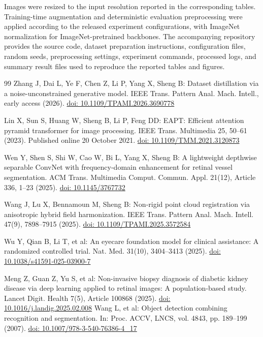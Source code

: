 \documentclass[pdflatex,sn-mathphys-num]{sn-jnl}
\theoremstyle{thmstyleone}
\theoremstyle{thmstyletwo}
\theoremstyle{thmstylethree}
\begin{document}
Images were resized to the input resolution reported in the corresponding
tables. Training-time augmentation and deterministic evaluation preprocessing
were applied according to the released experiment configurations, with
ImageNet normalization for ImageNet-pretrained backbones. The accompanying
repository provides the source code, dataset preparation instructions,
configuration files, random seeds, preprocessing settings, experiment
commands, processed logs, and summary result files used to reproduce the
reported tables and figures. \begin{thebibliography}{99}
Zhang J, Dai L, Ye F, Chen Z, Li P, Yang X, Sheng B:
Dataset distillation via a noise-unconstrained generative model.
IEEE Trans. Pattern Anal. Mach. Intell., early access (2026).
\href{https://doi.org/10.1109/TPAMI.2026.3690778}
{doi: 10.1109/TPAMI.2026.3690778}

Lin X, Sun S, Huang W, Sheng B, Li P, Feng DD:
EAPT: Efficient attention pyramid transformer for image processing.
IEEE Trans. Multimedia 25, 50--61 (2023).
Published online 20 October 2021.
\href{https://doi.org/10.1109/TMM.2021.3120873}
{doi: 10.1109/TMM.2021.3120873}

Wen Y, Shen S, Shi W, Cao W, Bi L, Yang X, Sheng B:
A lightweight depthwise separable ConvNet with frequency-domain enhancement
for retinal vessel segmentation.
ACM Trans. Multimedia Comput. Commun. Appl. 21(12),
Article 336, 1--23 (2025).
\href{https://doi.org/10.1145/3767732}
{doi: 10.1145/3767732}

Wang J, Lu X, Bennamoun M, Sheng B:
Non-rigid point cloud registration via anisotropic hybrid field harmonization.
IEEE Trans. Pattern Anal. Mach. Intell. 47(9), 7898--7915 (2025).
\href{https://doi.org/10.1109/TPAMI.2025.3572584}
{doi: 10.1109/TPAMI.2025.3572584}

Wu Y, Qian B, Li T, et al:
An eyecare foundation model for clinical assistance:
A randomized controlled trial.
Nat. Med. 31(10), 3404--3413 (2025).
\href{https://doi.org/10.1038/s41591-025-03900-7}
{doi: 10.1038/s41591-025-03900-7}

Meng Z, Guan Z, Yu S, et al:
Non-invasive biopsy diagnosis of diabetic kidney disease via deep learning
applied to retinal images: A population-based study.
Lancet Digit. Health 7(5), Article 100868 (2025).
\href{https://doi.org/10.1016/j.landig.2025.02.008}
{doi: 10.1016/j.landig.2025.02.008}
Wang L, et al:
Object detection combining recognition and segmentation.
In: Proc. ACCV, LNCS, vol. 4843, pp. 189--199 (2007).
\href{https://doi.org/10.1007/978-3-540-76386-4_17}{doi: 10.1007/978-3-540-76386-4\_17}



\end{thebibliography}
\end{document}
